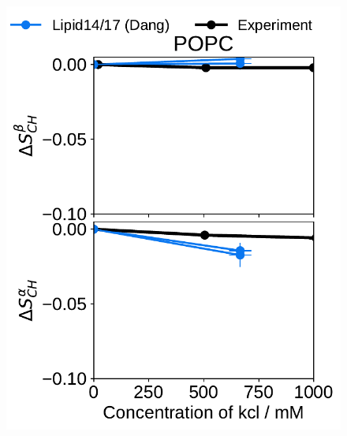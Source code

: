 

\begin{figure}[htb!] 
  \centering 
  \includegraphics[width=\figwidth]{../img/ecc_pops/l17/order_parameters_changes_A-B_POPC_kcl.pdf} 

\end{figure}
